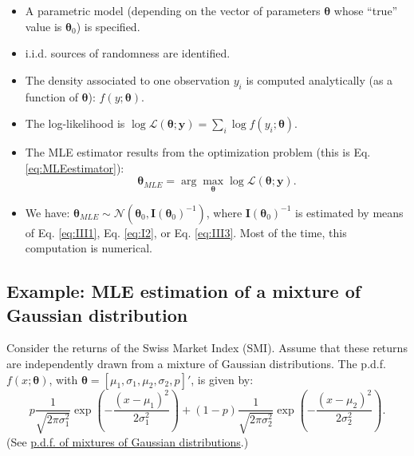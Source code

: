 \documentclass[
  12pt,
]{book}
\providecommand{\tightlist}{%
  \setlength{\itemsep}{0pt}\setlength{\parskip}{0pt}}
\theoremstyle{definition}
\theoremstyle{definition}
\theoremstyle{definition}
\theoremstyle{definition}
\theoremstyle{remark}
\begin{document}
\begin{itemize}
\tightlist
\item
  A parametric model (depending on the vector of parameters \(\boldsymbol\theta\) whose ``true'' value is \(\boldsymbol\theta_0\)) is specified.
\item
  i.i.d. sources of randomness are identified.
\item
  The density associated to one observation \(y_i\) is computed analytically (as a function of \(\boldsymbol\theta\)): \(f(y;\boldsymbol\theta)\).
\item
  The log-likelihood is \(\log \mathcal{L}(\boldsymbol\theta;\mathbf{y}) = \sum_i \log f(y_i;\boldsymbol\theta)\).
\item
  The MLE estimator results from the optimization problem (this is Eq. \eqref{eq:MLEestimator}):
  \begin{equation}
  \boldsymbol\theta_{MLE} = \arg \max_{\boldsymbol\theta} \log \mathcal{L}(\boldsymbol\theta;\mathbf{y}).
  \end{equation}
\item
  We have: \(\boldsymbol\theta_{MLE} \sim \mathcal{N}({\boldsymbol\theta}_0,\mathbf{I}(\boldsymbol\theta_0)^{-1})\), where \(\mathbf{I}(\boldsymbol\theta_0)^{-1}\) is estimated by means of Eq. \eqref{eq:III1}, Eq. \eqref{eq:I2}, or Eq. \eqref{eq:III3}. Most of the time, this computation is numerical.
\end{itemize}

\hypertarget{example-mle-estimation-of-a-mixture-of-gaussian-distribution}{%
\subsection{Example: MLE estimation of a mixture of Gaussian distribution}\label{example-mle-estimation-of-a-mixture-of-gaussian-distribution}}

Consider the returns of the Swiss Market Index (SMI). Assume that these returns are independently drawn from a mixture of Gaussian distributions. The p.d.f. \(f(x;\boldsymbol\theta)\), with \(\boldsymbol\theta = [\mu_1,\sigma_1,\mu_2,\sigma_2,p]'\), is given by:
\[
p \frac{1}{\sqrt{2\pi\sigma_1^2}}\exp\left(-\frac{(x - \mu_1)^2}{2\sigma_1^2}\right) + (1-p)\frac{1}{\sqrt{2\pi\sigma_2^2}}\exp\left(-\frac{(x - \mu_2)^2}{2\sigma_2^2}\right).
\]
(See \href{https://jrenne.shinyapps.io/density/}{p.d.f. of mixtures of Gaussian distributions}.)
\end{document}
